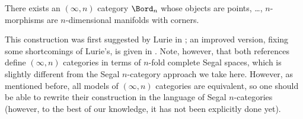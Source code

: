 \begin{theorem}\label{t:bordn-highercat}
  There exists an $(\infty, n)$ category $\Bord_n$ whose objects are points,
  \dots, $n$-morphisms are $n$-dimensional manifolds with corners.
\end{theorem}
This construction was first suggested by Lurie in ; an
improved version, fixing some shortcomings of Lurie's, is given in
. Note, however, that both references define $(\infty, n)$
categories in terms of $n$-fold complete Segal spaces, which is slightly
different from the Segal $n$-category approach we take here. However, as
mentioned before, all models of $(\infty, n)$ categories are equivalent, so one
should be able to rewrite their construction in the language of Segal
$n$-categories (however, to the best of our knowledge, it has not been explicitly
done yet).


\clearpage